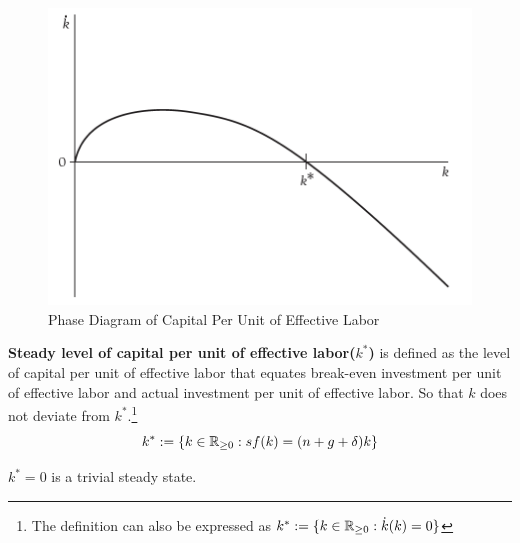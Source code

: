 \documentclass[11pt]{article}
\begin{document}
			\begin{figure}[h]
				\centering
				\includegraphics[width=0.6\linewidth]{figures/3_2.png}
				\caption{Phase Diagram of Capital Per Unit of Effective Labor}
			\end{figure}
			
			\newpage 
			
			\begin{definition}
			\textbf{Steady level of capital per unit of effective labor($k^*$)} is defined as the level of capital per unit of effective labor that equates break-even investment per unit of effective labor and actual investment per unit of effective labor. So that $k$ does not deviate from $k^*$.\footnote{The definition can also be expressed as $k^* := \{k \in \mathbb{R}_{\geq 0}: \dot{k}(k) = 0\}$}
				\begin{equation}
					k^* := \{k \in \mathbb{R}_{\geq 0}: sf(k) = (n+g+\delta) k\}
				\end{equation}
			\end{definition}
			\begin{remark}
				$k^* = 0$ is a trivial steady state.
			\end{remark}
			
\end{document}
